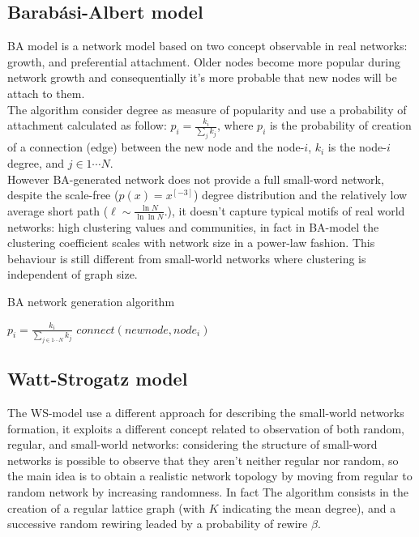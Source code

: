 \subsection{Barabási-Albert model}
\label{sn_ba_model}
BA model\cite{citeulike:90557} is a network model based on two concept observable in real networks: growth, and preferential attachment. Older nodes become more popular during network growth and consequentially it's more probable that new nodes will be attach to them.\\
The algorithm consider degree as measure of popularity and use a probability of attachment calculated as follow: $p_{i} = \frac{k_{i}}{\sum_{j} k_{j}}$, where $p_i$ is the probability of creation of a connection (edge) between the new node and the node-$i$, $k_{i}$ is the node-$i$ degree, and $j \in 1 \cdots N$.\\
However BA-generated network does not provide a full small-word network, despite the scale-free ($p(x)=x^[-3]$) degree distribution and the relatively low average short path ($\ell\sim\frac{\ln N}{\ln \ln N}. $), it doesn't capture typical motifs of real world networks: high clustering values and communities, in fact in BA-model the clustering coefficient scales with network size in a power-law fashion. This behaviour is still different from small-world networks where clustering is independent of graph size.

\begin{algorithm}
\caption{BA network generation algorithm}
\label{sn_ba_alg}
\begin{algorithmic}
	\STATE $p_{i} = \frac{k_{i}}{\sum_{j \in 1\cdots N} k_{j}}$
	 	\STATE $connect(newnode,node_{i})$
 	\ENDIF
\ENDFOR
\end{algorithmic}
\end{algorithm}

\subsection{Watt-Strogatz model}
\label{sn_ws_model}
The WS-model\cite{citeulike:1580006} use a different approach for describing the small-world networks formation, it exploits a different concept related to observation of both random, regular, and small-world networks: considering the structure of small-word networks is possible to observe that they aren't neither regular nor random, so the main idea is to obtain a realistic network topology by moving from regular to random network by increasing randomness. In fact The algorithm consists in the creation of a regular lattice graph (with $K$ indicating the mean degree), and a successive random rewiring leaded by a probability of rewire $\beta$.

